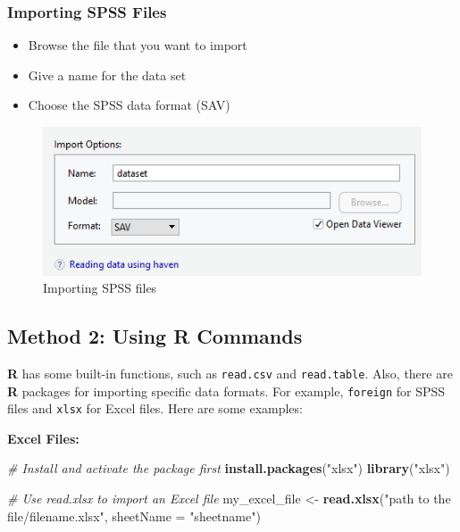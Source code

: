 \documentclass[]{book}
\newenvironment{Shaded}{\begin{snugshade}}{\end{snugshade}}
\newcommand{\CommentTok}[1]{\textcolor[rgb]{0.56,0.35,0.01}{\textit{#1}}}
\newcommand{\DataTypeTok}[1]{\textcolor[rgb]{0.13,0.29,0.53}{#1}}
\newcommand{\KeywordTok}[1]{\textcolor[rgb]{0.13,0.29,0.53}{\textbf{#1}}}
\newcommand{\NormalTok}[1]{#1}
\newcommand{\StringTok}[1]{\textcolor[rgb]{0.31,0.60,0.02}{#1}}
\providecommand{\tightlist}{%
  \setlength{\itemsep}{0pt}\setlength{\parskip}{0pt}}
\begin{document}
\hypertarget{importing-spss-files}{%
\subsubsection{Importing SPSS Files}\label{importing-spss-files}}

\begin{itemize}
\tightlist
\item
  Browse the file that you want to import
\item
  Give a name for the data set
\item
  Choose the SPSS data format (SAV)
\end{itemize}

\begin{figure}
\centering
\includegraphics{figure/img10.png}
\caption{Importing SPSS files}
\end{figure}

\hypertarget{method-2-using-r-commands}{%
\subsection{\texorpdfstring{Method 2: Using \textbf{R} Commands}{Method 2: Using R Commands}}\label{method-2-using-r-commands}}

\textbf{R} has some built-in functions, such as \texttt{read.csv} and \texttt{read.table}. Also, there are \textbf{R} packages for importing specific data formats. For example, \texttt{foreign} for SPSS files and \texttt{xlsx} for Excel files. Here are some examples:

\textbf{Excel Files:}

\begin{Shaded}
\begin{Highlighting}[]
\CommentTok{# Install and activate the package first}
\KeywordTok{install.packages}\NormalTok{(}\StringTok{"xlsx"}\NormalTok{)}
\KeywordTok{library}\NormalTok{(}\StringTok{"xlsx"}\NormalTok{)}

\CommentTok{# Use read.xlsx to import an Excel file}
\NormalTok{my_excel_file <-}\StringTok{ }\KeywordTok{read.xlsx}\NormalTok{(}\StringTok{"path to the file/filename.xlsx"}\NormalTok{, }\DataTypeTok{sheetName =} \StringTok{"sheetname"}\NormalTok{)}
\end{Highlighting}
\end{Shaded}
\end{document}
